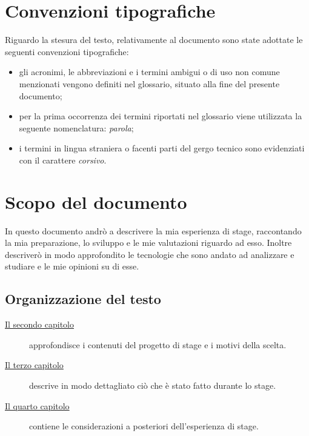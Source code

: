 \section{Convenzioni tipografiche}

Riguardo la stesura del testo, relativamente al documento sono state adottate le seguenti convenzioni tipografiche:
\begin{itemize}
	\item gli acronimi, le abbreviazioni e i termini ambigui o di uso non comune menzionati vengono definiti nel glossario, situato alla fine del presente documento;
	\item per la prima occorrenza dei termini riportati nel glossario viene utilizzata la seguente nomenclatura: \emph{parola}\glsfirstoccur;
	\item i termini in lingua straniera o facenti parti del gergo tecnico sono evidenziati con il carattere \emph{corsivo}.
\end{itemize}

\section{Scopo del documento}
In questo documento andrò a descrivere la mia esperienza di stage, raccontando la mia preparazione, lo sviluppo e le mie valutazioni
riguardo ad esso. Inoltre descriverò in modo approfondito le tecnologie che sono andato ad analizzare e studiare e le mie opinioni su di esse.


\subsection{Organizzazione del testo}

\begin{description}

    \item[{\hyperref[cap:descrizione-stage]{Il secondo capitolo}}] approfondisce i contenuti del progetto di stage e i motivi della scelta.

    \item[{\hyperref[cap:ilprogetto]{Il terzo capitolo}}] descrive in modo dettagliato ciò che è stato fatto durante lo stage.

    \item[{\hyperref[cap:valutazione-retrospettiva]{Il quarto capitolo}}] contiene le considerazioni a posteriori dell'esperienza di stage.

\end{description}


